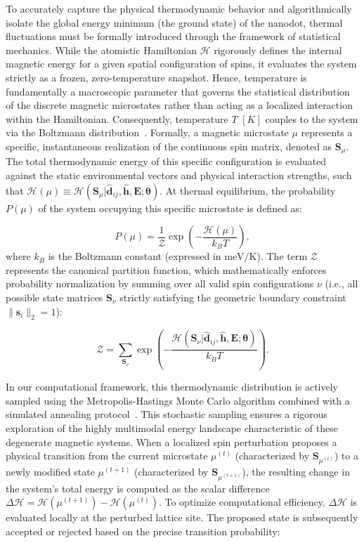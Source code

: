 \documentclass[a4paper,fleqn]{cas-sc}
\begin{document}
To accurately capture the physical thermodynamic behavior and algorithmically isolate the global energy minimum (the ground state) of the nanodot, thermal fluctuations must be formally introduced through the framework of statistical mechanics. While the atomistic Hamiltonian $\mathcal{H}$ rigorously defines the internal magnetic energy for a given spatial configuration of spins, it evaluates the system strictly as a frozen, zero-temperature snapshot. Hence, temperature is fundamentally a macroscopic parameter that governs the statistical distribution of the discrete magnetic microstates rather than acting as a localized interaction within the Hamiltonian. Consequently, temperature $T$ $[K]$ couples to the system via the Boltzmann distribution~\cite{eriksson2017atomistic}. Formally, a magnetic microstate $\mu$ represents a specific, instantaneous realization of the continuous spin matrix, denoted as $\mathbf{S}_\mu$. The total thermodynamic energy of this specific configuration is evaluated against the static environmental vectors and physical interaction strengths, such that $\mathcal{H}(\mu) \equiv \mathcal{H}\left(\mathbf{S}_\mu|\mathbf{\hat{d}}_{ij},\hat{\mathbf{h}},\mathbf{E};\boldsymbol{\theta}\right)$. At thermal equilibrium, the probability $P(\mu)$ of the system occupying this specific microstate is defined as:

\begin{equation}\label{eq:Boltzmann}
P(\mu) = \frac{1}{\mathcal{Z}} \exp\left(-\frac{\mathcal{H}(\mu)}{k_B T}\right),
\end{equation}
where $k_B$ is the Boltzmann constant (expressed in $\text{meV/K}$). The term $\mathcal{Z}$ represents the canonical partition function, which mathematically enforces probability normalization by summing over all valid spin configurations $\nu$ (i.e., all possible state matrices $\mathbf{S}_\nu$ strictly satisfying the geometric boundary constraint $\|\mathbf{s}_i\|_2 = 1$):

\begin{equation}\label{eq:PartitionFunction}
\mathcal{Z} = \sum_{\mathbf{S}_\nu} \exp\left(-\frac{\mathcal{H}\left(\mathbf{S}_\nu|\mathbf{\hat{d}}_{ij},\hat{\mathbf{h}},\mathbf{E};\boldsymbol{\theta}\right)}{k_B T}\right).
\end{equation}

In our computational framework, this thermodynamic distribution is actively sampled using the Metropolis-Hastings Monte Carlo algorithm combined with a simulated annealing protocol~\cite{landau2021guide}. This stochastic sampling ensures a rigorous exploration of the highly multimodal energy landscape characteristic of these degenerate magnetic systems. When a localized spin perturbation proposes a physical transition from the current microstate $\mu^{(t)}$ (characterized by $\mathbf{S}_{\mu^{(t)}}$) to a newly modified state $\mu^{(t+1)}$ (characterized by $\mathbf{S}_{\mu^{(t+1)}}$), the resulting change in the system's total energy is computed as the scalar difference $\Delta \mathcal{H} = \mathcal{H}(\mu^{(t+1)}) - \mathcal{H}(\mu^{(t)})$. To optimize computational efficiency, $\Delta \mathcal{H}$ is evaluated locally at the perturbed lattice site. The proposed state is subsequently accepted or rejected based on the precise transition probability:
\end{document}
